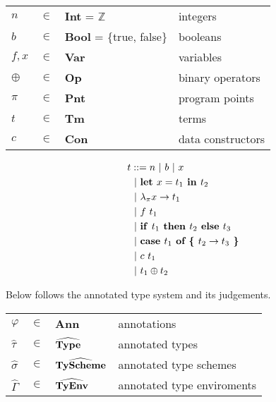 \documentclass[10pt]{article}
\newcommand{\keyw}[1]{\textrm{\textbf{#1}}}
\newcommand{\GammaH}{\widehat{\Gamma}}
\newcommand{\tauH}{\widehat{\tau}}
\newcommand{\sigmaH}{\widehat{\sigma}}
\newcommand{\letin}[2]{\keyw{let~} #1 \keyw{~in~} #2}
\newcommand{\lam}[2]{\keyw{$\lambda_\pi$} #1 \rightarrow #2} %
\newcommand{\ite}[3]{\keyw{if~} #1 \keyw{~then~} #2 \keyw{~else~} #3}
\newcommand{\case}[3]{\keyw{case~} #1 \keyw{~of \{~} #2 \rightarrow #3 \keyw{~\}}}
\newcommand{\app}[2]{#1 ~ #2}
\newcommand{\con}[2]{#1 ~ #2}
\newcommand{\infix}[2]{#1 \oplus #2}
\begin{document}

\begin{table}[htp]
	\centering
	\begin{tabular}{llll}
		$n$     & $\in$     & \textbf{Int} = $\mathbb{Z}$         & integers\\
		$b$     & $\in$     & \textbf{Bool} = \{true, false\}   & booleans\\
		$f,x$   & $\in$     & \textbf{Var}                      & variables\\
		$\oplus$ & $\in$     & \textbf{Op}                       & binary operators\\
		$\pi$   & $\in$     & \textbf{Pnt}                      & program points\\
		$t$     & $\in$     & \textbf{Tm}                       & terms\\
		$c$     & $\in$     & \textbf{Con}                   & data constructors\\
	\end{tabular}
\end{table}

\begin{align*}
	t   & ::= n ~|~ b ~|~ x\\
		& ~|~ \letin{x = t_1}{t_2}\\
		& ~|~ \lam{x}{t_1}\\
		& ~|~ \app{f}{t_1}\\
		& ~|~ \ite{t_1}{t_2}{t_3}\\
		& ~|~ \case{t_1}{t_2}{t_3}\\
		& ~|~ \con{c}{t_1}\\
		& ~|~ \infix{t_1}{t_2}\\
\end{align*}

Below follows the annotated type system and its judgements.

\begin{table}[htp]
	\centering
	\begin{tabular}{llll}
		$\varphi$ & $\in$   & \textbf{Ann}                           & annotations\\
		$\tauH$   & $\in$   & $\widehat{\textrm{\textbf{Type}}}$     & annotated types\\
		$\sigmaH$ & $\in$   & $\widehat{\textrm{\textbf{TyScheme}}}$ & annotated type schemes\\
		$\GammaH$ & $\in$   & $\widehat{\textrm{\textbf{TyEnv}}}$    & annotated type enviroments\\
	\end{tabular}
\end{table}
\end{document}
